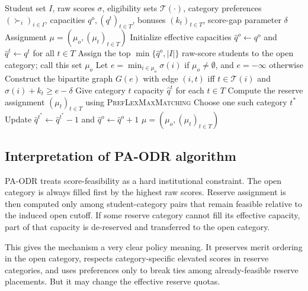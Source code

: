 \documentclass[12pt]{article}
\newcommand{\T}{\mathcal{T}}
\newcommand{\1}{\mathbf{1}}
\begin{document}
\begin{algorithm}[H]
\caption{Preference-Aware Overlapping De-Reservation (PA-ODR)}
\begin{algorithmic}[1]
\Require Student set $I$, raw scores $\sigma$, eligibility sets $\T(\cdot)$, category preferences $(\succ_i)_{i\in I}$, capacities $q^o,(q^t)_{t\in T}$, bonuses $(k_t)_{t\in T}$, score-gap parameter $\delta$
\Ensure Assignment $\mu=(\mu_o,(\mu_t)_{t\in T})$
\State Initialize effective capacities $\hat q^o\gets q^o$ and $\hat q^t\gets q^t$ for all $t\in T$
\Loop
    \State Assign the top $\min\{\hat q^o,|I|\}$ raw-score students to the open category; call this set $\mu_o$
    \State Let $e=\min_{i\in\mu_o}\sigma(i)$ if $\mu_o\neq\emptyset$, and $e=-\infty$ otherwise
    \State Construct the bipartite graph $G(e)$ with edge $(i,t)$ iff $t\in\T(i)$ and $\sigma(i)+k_t\ge e-\delta$
    \State Give category $t$ capacity $\hat q^t$ for each $t\in T$
    \State Compute the reserve assignment $(\mu_t)_{t\in T}$ using \textsc{PrefLexMaxMatching}
        \State Choose one such category $t^\ast$
        \State Update $\hat q^{t^\ast}\gets\hat q^{t^\ast}-1$ and $\hat q^o\gets\hat q^o+1$
    \Else
        \State \Return $\mu=(\mu_o,(\mu_t)_{t\in T})$
    \EndIf
\EndLoop
\end{algorithmic}
\end{algorithm}

\subsection{Interpretation of PA-ODR algorithm}

PA-ODR treats score-feasibility as a hard institutional constraint. The open category is always filled first by the highest raw scores. Reserve assignment is then computed only among student-category pairs that remain feasible relative to the induced open cutoff. If some reserve category cannot fill its effective capacity, part of that capacity is de-reserved and transferred to the open category.

This gives the mechanism a very clear policy meaning. It preserves merit ordering in the open category, respects category-specific elevated scores in reserve categories, and uses preferences only to break ties among already-feasible reserve placements. But it may change the effective reserve quotas.
\end{document}
